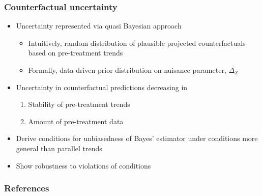 \documentclass[table, xcolor={dvipsnames}, 9pt]{beamer}
\theoremstyle{newstyle}
\begin{document}
\begin{frame}
\frametitle{Counterfactual uncertainty}
\begin{itemize}
\item Uncertainty represented via quasi Bayesian approach \citep[][chapter 7]{gelmanhill2006}
\begin{itemize}
\item \pause Intuitively, random distribution of plausible projected counterfactuals based on pre-treatment trends
\item \pause Formally, data-driven prior distribution on nuisance parameter, $\Delta_{\mathcal{S}}$
\end{itemize}	
\item \pause Uncertainty in counterfactual predictions decreasing in 
\begin{enumerate}
\item \pause Stability of pre-treatment trends 
\item \pause Amount of pre-treatment data
\end{enumerate} 
\item \pause Derive conditions for unbiasedness of Bayes' estimator under conditions more general than parallel trends
\item \pause Show robustness to violations of conditions
\end{itemize}
\end{frame}
\begin{frame}[allowframebreaks]
\frametitle{References} 
\scriptsize

\end{frame}
\end{document}
